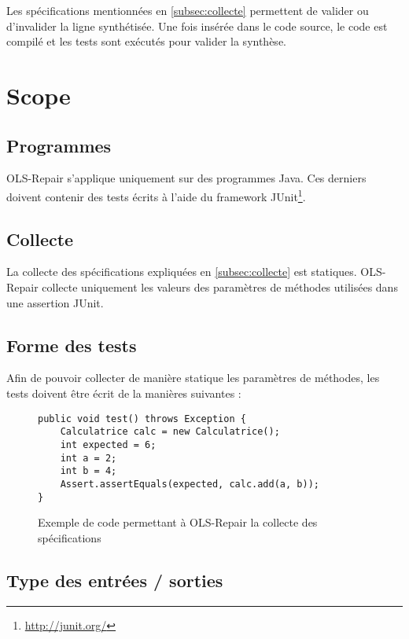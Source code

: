 \par Les spécifications mentionnées en \ref{subsec:collecte} permettent de valider ou d'invalider la ligne synthétisée. Une fois insérée dans le code source, le code est compilé et les tests sont exécutés pour valider la synthèse.





\section{Scope}
\label{sec:scope}

\subsection{Programmes}

OLS-Repair s'applique uniquement sur des programmes Java. Ces derniers doivent contenir des tests écrits à l'aide du framework JUnit\footnote{\url{http://junit.org/}}.


\subsection{Collecte}

La collecte des spécifications expliquées en \ref{subsec:collecte} est statiques. OLS-Repair collecte uniquement les valeurs des paramètres de méthodes utilisées dans une assertion JUnit.

\subsection{Forme des tests}

Afin de pouvoir collecter de manière statique les paramètres de méthodes, les tests doivent être écrit de la manières suivantes :

\begin{figure}[H]
\begin{lstlisting}
public void test() throws Exception {
    Calculatrice calc = new Calculatrice();
    int expected = 6;
    int a = 2;
    int b = 4;
    Assert.assertEquals(expected, calc.add(a, b));
}
\end{lstlisting}
\caption{Exemple de code permettant à OLS-Repair la collecte des spécifications}
\end{figure}


\subsection{Type des entrées / sorties}

